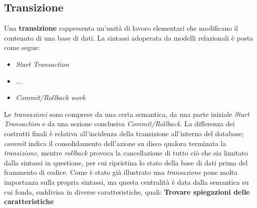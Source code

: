 \documentclass{article}
\begin{document}
\subsection*{Transizione}
\large
Una \textbf{transizione} rappresenta un'unità di lavoro elementari che modificano il contenuto di una base di dati. La sintassi adoperata da modelli relazionali è posta come segue:
\begin{itemize}[label={ }, leftmargin=1cm]
    \itemsep0em
    \item \textit{Start Transaction}
    \item \textit{...}
    \item \textit{Commit/Rollback work}
\end{itemize}
Le \textit{transazioni} sono comprese da una certa semantica, da una parte iniziale \textit{Start Transaction} e da una sezione conclusiva \textit{Commit/Rollback}. La differenza dei costrutti finali è relativa all'incidenza della transizione all'interno del database; \textit{commit} indica il consolidamento dell'azione su disco qualora terminata la \textit{transizione}, mentre \textit{rollback} provoca la cancellazione di tutto ciò che sia limitato dalla sintassi in questione, per cui ripristina lo stato della base di dati prima del frammento di codice.
Come è stato già illustrato una \textit{transazione} pone molta importanza sulla propria sintassi, ma questa centralità è data dalla semantica su cui fonda, suddivisa in diverse caratteristiche, quali: \textbf{Trovare spiegazioni delle caratteristiche}
\end{document}
